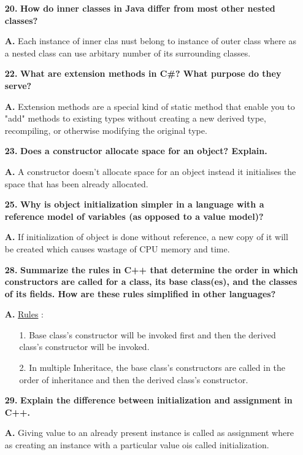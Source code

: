 \documentclass[letterpaper]{article}
\begin{document}
\begin{large}
\begin{flushleft}
\begin{enumerate}
\item[\textbf{20.}]
\textbf{How do inner classes in Java differ from most other nested classes?}
\item[\textbf{A.}]
Each instance of inner clas nust belong to instance of outer class where as a nested class can use arbitary number of its surrounding classes.

\item[\textbf{22.}]
\textbf{What are extension methods in C\#? What purpose do they serve?}
\item[\textbf{A.}]
Extension methods are a special kind of static method that enable you to "add" methods to existing types without creating a new derived type, recompiling, or otherwise modifying the original type.

\item[\textbf{23.}]
\textbf{Does a constructor allocate space for an object? Explain.}
\item[\textbf{A.}]
A constructor doesn't allocate space for an object instead it initialises the space that has been already allocated.

\pagebreak

\item[\textbf{25.}]
\textbf{Why is object initialization simpler in a language with a reference model of variables (as opposed to a value model)?}
\item[\textbf{A.}]
If initialization of object is done without reference, a new copy of it will be created which causes wastage of CPU memory and time.

\item[\textbf{28.}]
\textbf{Summarize the rules in C++ that determine the order in which constructors are called for a class, its base class(es), and the classes of its fields. How are these rules simplified in other languages?}
\item[\textbf{A.}]
\underline{Rules} :\\
\begin{enumerate}
\item[1.] Base class’s constructor will be invoked first and then the derived class’s constructor will be invoked.
\item[2.] In multiple Inheritace, the base class’s constructors are called in the order of inheritance and then the derived class’s constructor.

\end{enumerate}
\item[\textbf{29.}]
\textbf{Explain the difference between initialization and assignment in C++.}
\item[\textbf{A.}]
Giving value to an already present instance is called as assignment where as creating an instance with a particular value ois called initialization.


\end{enumerate}
\end{flushleft}
\end{large}
\end{document}
